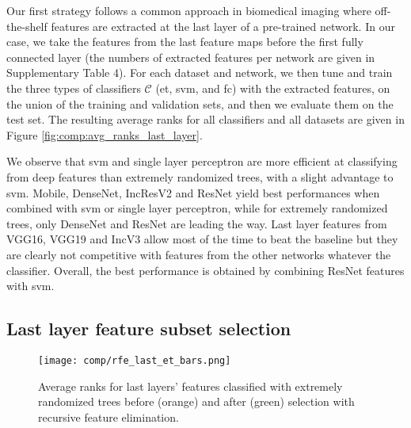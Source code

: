 Our first strategy follows a common approach in biomedical imaging where off-the-shelf features are extracted at the last layer of a pre-trained network. In our case, we take the features from the last feature maps before the first fully connected layer (the numbers of extracted features per network are given in Supplementary Table 4). For each dataset and network, we then tune and train the three types of classifiers $\mathcal{C}$ (\acrshort{et}, \acrshort{svm}, and \acrshort{fc}) with the extracted features, on the union of the training and validation sets, and then we evaluate them on the test set. The resulting average ranks for all classifiers and all datasets are given in Figure \ref{fig:comp:avg_ranks_last_layer}.

We observe that \acrshort{svm} and single layer perceptron are more efficient at classifying from deep features than extremely randomized trees, with a slight advantage to \acrshort{svm}. Mobile, DenseNet, IncResV2 and ResNet yield best performances when combined with \acrshort{svm} or single layer perceptron, while for extremely randomized trees, only DenseNet and ResNet are leading the way. Last layer features from VGG16, VGG19 and IncV3 allow most of the time to beat the baseline but they are clearly not competitive with features from the other networks whatever the classifier. Overall, the best performance is obtained by combining ResNet features with \acrshort{svm}.



\subsection{Last layer feature subset selection}
\label{ssec:comp:exp_feat_sel}


\begin{figure}
	\center 
    \texttt{[image: comp/rfe\_last\_et\_bars.png]}
    \caption{Average ranks for last layers' features classified with extremely randomized trees before (orange) and after (green) selection with recursive feature elimination.}
    \label{fig:comp:exp_rfe_last_et_cmp}
\end{figure}


